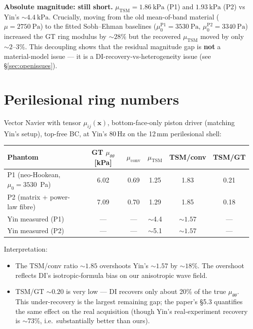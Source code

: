 \documentclass[11pt,letterpaper]{article}
\newcommand{\vect}[1]{\boldsymbol{#1}}
\begin{document}
\textbf{Absolute magnitude: still short.} $\mu_{\mathrm{TSM}} =
\SI{1.86}{\kilo\pascal}$ (P1) and $\SI{1.93}{\kilo\pascal}$ (P2)
vs Yin's ${\sim}\SI{4.4}{\kilo\pascal}$. Crucially, moving from the
old mean-of-band material ($\mu = \SI{2750}{\pascal}$) to the fitted
Sobh--Ehman baselines ($\mu_0^{\text{P1}} = \SI{3530}{\pascal}$,
$\mu_0^{\text{P2}} = \SI{3340}{\pascal}$) increased the GT ring
modulus by ${\sim}28\%$ but the recovered $\mu_{\mathrm{TSM}}$ moved
by only ${\sim}2$--$3\%$. This decoupling shows that the residual
magnitude gap is \textbf{not} a material-model issue — it is a
DI-recovery-vs-heterogeneity issue (see \S\ref{sec:openissues}).

\section{Perilesional ring numbers}
\label{sec:ring}

Vector Navier with tensor $\mu_{ij}(\vect x)$, bottom-face-only piston
driver (matching Yin's setup), top-free BC, at Yin's 80\,\si{\hertz} on
the 12\,\si{\milli\metre} perilesional shell:

\begin{center}
\begin{tabular}{lccccc}
\toprule
Phantom & GT $\mu_{\theta\theta}$ [\si{\kilo\pascal}]
        & $\mu_{\mathrm{conv}}$ & $\mu_{\mathrm{TSM}}$
        & TSM/conv & TSM/GT \\
\midrule
P1 (neo-Hookean, $\mu_0=3530$~Pa) & 6.02 & 0.69 & 1.25 & 1.83 & 0.21 \\
P2 (matrix + power-law fibre)     & 7.09 & 0.70 & 1.29 & 1.85 & 0.18 \\
\midrule
Yin measured (P1)    & --- & --- & $\sim$4.4 & $\sim 1.57$ & --- \\
Yin measured (P2)    & --- & --- & $\sim$5.1 & $\sim 1.57$ & --- \\
\bottomrule
\end{tabular}
\end{center}

Interpretation:
\begin{itemize}
\item The TSM/conv ratio $\sim 1.85$ overshoots Yin's $\sim 1.57$ by
${\sim}18\%$. The overshoot reflects DI's isotropic-formula bias on
our anisotropic wave field.
\item TSM/GT $\sim 0.20$ is very low --- DI recovers only about 20\%
of the true $\mu_{\theta\theta}$. This under-recovery is the largest
remaining gap; the paper's \S 5.3 quantifies the same effect on the
real acquisition (though Yin's real-experiment recovery is
${\sim}$73\%, i.e.\ substantially better than ours).
\end{itemize}
\end{document}
